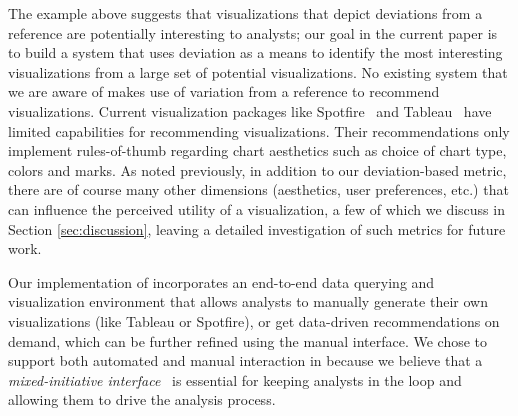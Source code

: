 \noindent The example above suggests that visualizations that depict
deviations from a reference are potentially interesting to analysts;
our goal in the current paper is to build a system 
that uses deviation as a means to identify
the most interesting visualizations from a large set of potential visualizations.
No existing system that we are aware of makes use of variation from a reference
to recommend visualizations.  
Current visualization packages like Spotfire~\cite{Ahlberg:1996:SIE:245882.245893} and Tableau~\cite{polaris} have limited capabilities for 
recommending visualizations.
Their recommendations only implement rules-of-thumb 
regarding chart aesthetics such as choice of
chart type, colors and marks.
As noted previously, in addition to our deviation-based metric,
there are of course many other dimensions (aesthetics, user
preferences, etc.) that can influence the perceived utility of a
visualization, a few of which we discuss in Section
\ref{sec:discussion}, leaving a detailed investigation of such metrics
for future work.

Our implementation of \SeeDB incorporates an end-to-end data querying and 
visualization environment that allows analysts to manually generate 
their own visualizations (like Tableau or Spotfire), or get data-driven recommendations on demand, which
can be further refined using the manual interface.
We chose to support both automated and manual interaction in \SeeDB because we 
believe that a {\em mixed-initiative interface}~\cite{mixed_initiative} is essential for keeping 
analysts in the loop and allowing them to drive the analysis process.

